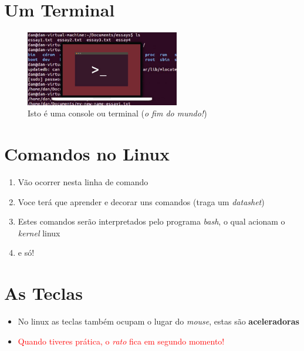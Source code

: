 \documentclass[final,a4paper]{article}
\begin{document}
\section{Um Terminal}


\begin{figure}[!htb]
\centering
\includegraphics[width=0.6\textwidth , height=0.5\textheight]{figuras/terminal_unico.jpg}
\caption{Isto é uma console ou terminal (\textit{o fim do mundo!})}
\end{figure}


\section{Comandos no Linux}

\begin{enumerate}
  \item Vão ocorrer nesta linha de comando
  \item Voce terá que aprender e decorar uns comandos (traga um \textit{datashet})
  \item Estes comandos serão interpretados pelo programa \textit{bash}, o qual
  acionam o \textit{kernel} linux
  \item e só!
\end{enumerate}



\section{As Teclas}


\begin{itemize}
  \item No linux as teclas também ocupam o lugar do \textit{mouse}, estas
s\~ao \textbf{aceleradoras}

\item \textcolor{red}{Quando tiveres prática, o \textit{rato} fica em segundo momento!}

\end{itemize}
\end{document}

